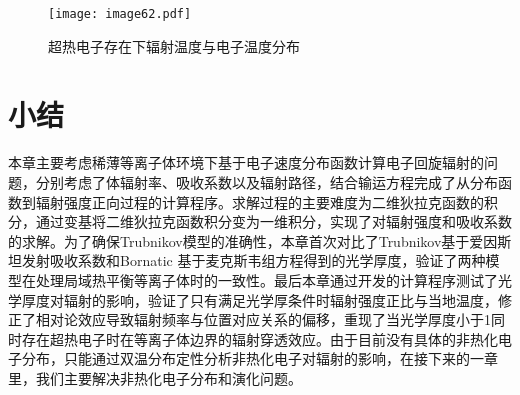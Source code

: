 \begin{figure}[H]
\centering
\texttt{[image: image62.pdf]}
\caption{\label{fig:STdistri}超热电子存在下辐射温度与电子温度分布}
\end{figure}

\section{小结}
本章主要考虑稀薄等离子体环境下基于电子速度分布函数计算电子回旋辐射的问题，分别考虑了体辐射率、吸收系数以及辐射路径，结合输运方程完成了从分布函数到辐射强度正向过程的计算程序。求解过程的主要难度为二维狄拉克函数的积分，通过变基将二维狄拉克函数积分变为一维积分，实现了对辐射强度和吸收系数的求解。为了确保Trubnikov模型的准确性\cite{RN1344}，本章首次对比了Trubnikov基于爱因斯坦发射吸收系数和Bornatic 基于麦克斯韦组方程得到的光学厚度\cite{RN351}，验证了两种模型在处理局域热平衡等离子体时的一致性。最后本章通过开发的计算程序测试了光学厚度对辐射的影响，验证了只有满足光学厚条件时辐射强度正比与当地温度，修正了相对论效应导致辐射频率与位置对应关系的偏移，重现了当光学厚度小于1同时存在超热电子时在等离子体边界的辐射穿透效应。由于目前没有具体的非热化电子分布，只能通过双温分布定性分析非热化电子对辐射的影响，在接下来的一章里，我们主要解决非热化电子分布和演化问题。











